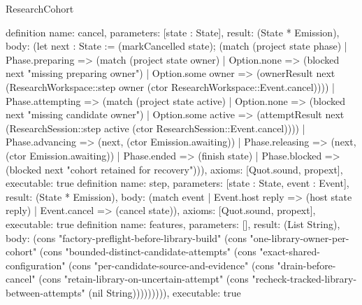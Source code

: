 \begin{lexlean}{ResearchCohort}
\begin{semanticmodule}
{}
definition{
 name: cancel,
 parameters: [state : State],
 result: (State * Emission),
 body: (let next : State := (markCancelled state); (match (project state phase)
 | Phase.preparing => (match (project state owner) | Option.none => (blocked next "missing preparing owner") | Option.some owner => (ownerResult next (ResearchWorkspace::step owner (ctor ResearchWorkspace::Event.cancel))))
 | Phase.attempting => (match (project state active) | Option.none => (blocked next "missing candidate owner") | Option.some active => (attemptResult next (ResearchSession::step active (ctor ResearchSession::Event.cancel))))
 | Phase.advancing => (next, (ctor Emission.awaiting))
 | Phase.releasing => (next, (ctor Emission.awaiting))
 | Phase.ended => (finish state)
 | Phase.blocked => (blocked next "cohort retained for recovery"))),
 axioms: [Quot.sound, propext],
 executable: true
}
definition{
 name: step,
 parameters: [state : State, event : Event],
 result: (State * Emission),
 body: (match event | Event.host reply => (host state reply) | Event.cancel => (cancel state)),
 axioms: [Quot.sound, propext],
 executable: true
}
definition{
 name: features,
 parameters: [],
 result: (List String),
 body: (cons "factory-preflight-before-library-build" (cons "one-library-owner-per-cohort" (cons "bounded-distinct-candidate-attempts" (cons "exact-shared-configuration" (cons "per-candidate-source-and-evidence" (cons "drain-before-cancel" (cons "retain-library-on-uncertain-attempt" (cons "recheck-tracked-library-between-attempts" (nil String))))))))),
 executable: true
}
\end{semanticmodule}
\end{lexlean}
